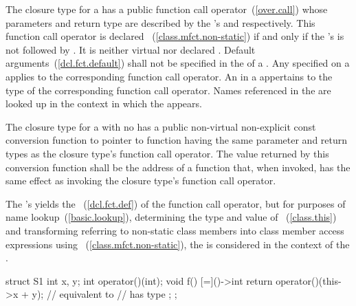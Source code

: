 \pnum
The closure type for a  has a public
 function call operator~(\ref{over.call}) whose parameters and return type
are described by the 's
 and 
respectively. This function call operator is declared
~(\ref{class.mfct.non-static}) if and only if the
's  is not
followed by . It is neither virtual nor declared . Default
arguments~(\ref{dcl.fct.default}) shall not be specified in the
 of a . Any
 specified on a 
applies to the corresponding function call operator.
An  in a  appertains
to the type of the corresponding function call operator. \enternote Names referenced in
the  are looked up in the context in which the
 appears. \exitnote

\pnum
The closure type for a  with no 
has a public non-virtual non-explicit const conversion function to pointer to function having
the same parameter and return types as the closure type's function call operator. The
value returned by this conversion function shall be the address of a function that, when
invoked, has the same effect as invoking the closure type's function call operator.

\pnum
The 's  yields the
~(\ref{dcl.fct.def}) of the function call operator, but for
purposes of name lookup~(\ref{basic.lookup}), determining the type and value of
~(\ref{class.this}) and transforming 
referring to non-static class members into class member access expressions using
~(\ref{class.mfct.non-static}), the  is
considered in the context of the . \enterexample

\begin{codeblock}
struct S1 {
  int x, y;
  int operator()(int);
  void f() {
    [=]()->int {
      return operator()(this->x + y); // equivalent to 
                                      //  has type 
    };
  }
};
\end{codeblock}
\exitexample

